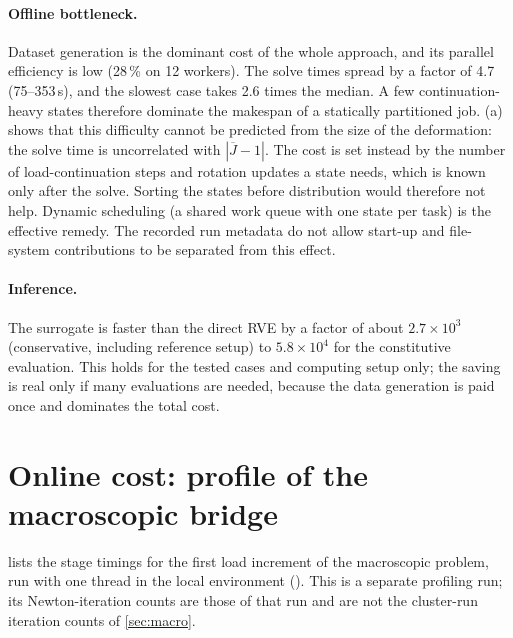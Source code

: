 \paragraph{Offline bottleneck.} Dataset generation is the dominant cost of the
whole approach, and its parallel efficiency is low (28\,\% on 12 workers). The
solve times spread by a factor of 4.7 (75--353\,s), and the slowest case takes
2.6 times the median. A few continuation-heavy states therefore dominate the
makespan of a statically partitioned job. (a) shows that
this difficulty cannot be predicted from the size of the deformation: the solve
time is uncorrelated with $|\overline J-1|$. The cost is set instead by the number of
load-continuation steps and rotation updates a state needs, which is known only
after the solve. Sorting the states before distribution would therefore not help.
Dynamic scheduling (a shared work queue with one state per task) is the effective
remedy. The recorded run metadata do not allow start-up and file-system
contributions to be separated from this effect.

\paragraph{Inference.} The surrogate is faster than the direct RVE by a factor of about $2.7\times10^3$ (conservative,
including reference setup) to $5.8\times10^4$ for the constitutive evaluation. This holds for the
tested cases and computing setup only; the saving is real only if many evaluations are needed, because
the data generation is paid once and dominates the total cost.

\section{Online cost: profile of the macroscopic bridge}

 lists the stage timings for the first load increment of the
macroscopic problem, run with one thread in the local environment
().
This is a separate profiling run; its Newton-iteration counts are those of that run and are not the cluster-run iteration counts of \cref{sec:macro}.

